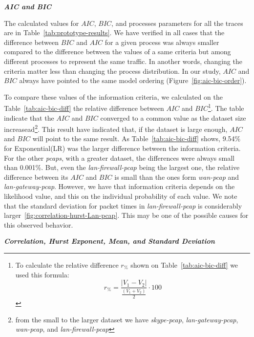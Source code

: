 \smallskip \noindent  \textbf{\textit{AIC and BIC}}

The calculated values for $AIC$, $BIC$, and processes parameters for all the traces are in Table~\ref{tab:prototype-results}. We have verified in all cases  that the difference between $BIC$ and $AIC$ for a given process was always smaller compared to the difference between the values of a same criteria but among different processes to represent the same traffic. In another words, changing the criteria matter less than changing the process distribution. In our study,  $AIC$ and $BIC$ always have pointed to the same model ordering (Figure~\ref{fig:aic-bic-order}).

To compare these values of the information criteria, we calculated on the Table~\ref{tab:aic-bic-diff} the relative difference between $AIC$ and $BIC$\footnote{ 
To calculate the relative difference $r_\%$ shown on Table~\ref{tab:aic-bic-diff} we used this formula:
\begin{equation}
    r_\% = \frac{|V_1-V_2|}{\frac{(V_1+V_2)}{2}}\cdot100 
\end{equation}
}. The table indicate that the $AIC$ and $BIC$ converged to a common value as  the dataset size increasead\footnote{from the small to the larger dataset we have \textit{skype-pcap}, \textit{lan-gateway-pcap}, \textit{wan-pcap}, and \textit{lan-firewall-pcap}}. 
This result have indicated that, if the dataset is large enough, $AIC$ and $BIC$ will point to the same result. As Table~\ref{tab:aic-bic-diff} shows, 9.54\% for Exponential(LR) was the larger difference between the information criteria. For the other \textit{pcaps}, with a greater dataset, the differences were always small than 0.001\%. But, even the \textit{lan-firewall-pcap} being the largest one, the relative difference between its $AIC$ and $BIC$ is small than the ones form \textit{wan-pcap} and \textit{lan-gateway-pcap}. However, we have that information criteria depends on the likelihood value, and this on the individual probability of each value. We note that the standard deviation for packet times in \textit{lan-firewall-pcap} is considerably larger~\ref{fig:correlation-hurst-Lan-pcap}. This may be one of the possible causes for this observed behavior.



\smallskip \noindent  \textbf{\textit{Correlation, Hurst Exponent, Mean, and Standard Deviation}} 

